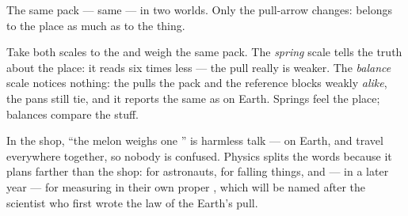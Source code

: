 \begin{omfigure}

{\small The same pack --- same  --- in two worlds. Only the
pull-arrow changes:  belongs to the place as much as to the
thing.}
\end{omfigure}

\begin{example}\label{ex:g4:weight-and-mass:twoscales}
Take both scales to the  and weigh the same pack. The
\emph{spring} scale tells the truth about the place: it reads six
times less --- the pull really is weaker. The \emph{balance} scale
notices nothing: the  pulls the pack and the reference blocks
weakly \emph{alike}, the pans still tie, and it reports the same
 as on Earth. Springs feel the place; balances compare the
stuff.
\end{example}

\begin{remark}\label{rem:g4:weight-and-mass:words}
In the shop, ``the melon weighs one '' is harmless talk ---
on Earth,  and  travel everywhere together, so nobody is
confused. Physics splits the words because it plans farther than
the shop: for astronauts, for falling things, and --- in a later
year --- for measuring  in their own proper , which will
be named after the scientist who first wrote the law of the Earth's
pull.
\end{remark}

